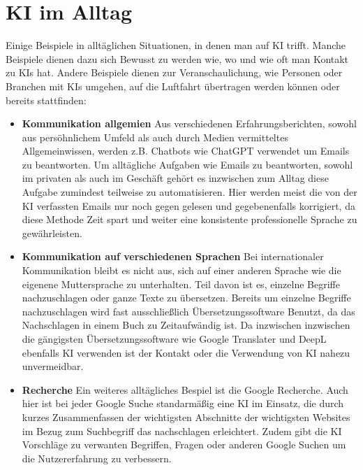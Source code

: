 \section{KI im Alltag}
Einige Beispiele in alltäglichen Situationen, in denen man auf KI trifft. Manche Beispiele dienen dazu sich 
Bewusst zu werden wie, wo und wie oft man Kontakt zu KIs hat. Andere Beispiele dienen zur Veranschaulichung, 
wie Personen oder Branchen mit KIs umgehen, auf die Luftfahrt übertragen werden können oder bereits stattfinden:
\smallskip
\begin{itemize}
    \item \textbf{Kommunikation allgemien}
        Aus verschiedenen Erfahrungsberichten, sowohl aus persöhnlichem Umfeld als auch durch Medien 
        vermitteltes Allgemeinwissen, werden z.B. Chatbots wie ChatGPT verwendet um Emails zu beantworten.
        Um alltägliche Aufgaben wie Emails zu beantworten, sowohl im privaten als auch im Geschäft gehört 
        es inzwischen zum Alltag diese Aufgabe zumindest teilweise zu automatisieren. Hier werden meist die 
        von der KI verfassten Emails nur noch gegen gelesen und gegebenenfalls korrigiert, da diese Methode 
        Zeit spart und weiter eine konsistente professionelle Sprache zu gewährleisten.

    \item \textbf{Kommunikation auf verschiedenen Sprachen}
        Bei internationaler Kommunikation bleibt es nicht aus, sich auf einer anderen Sprache wie die eigenene 
        Muttersprache zu unterhalten. Teil davon ist es, einzelne Begriffe nachzuschlagen oder ganze Texte zu 
        übersetzen. Bereits um einzelne Begriffe nachzuschlagen wird fast ausschließlich Übersetzungssoftware 
        Benutzt, da das Nachschlagen in einem Buch zu Zeitaufwändig ist. Da inzwischen inzwischen die gängigsten 
        Übersetzungssoftware wie Google Translater und DeepL ebenfalls KI verwenden ist der Kontakt oder die 
        Verwendung von KI nahezu unvermeidbar.
        
    \item \textbf{Recherche}
        Ein weiteres alltägliches Bespiel ist die Google Recherche. Auch hier ist bei jeder Google Suche 
        standarmäßig eine KI im Einsatz, die durch kurzes Zusammenfassen der wichtigsten Abschnitte der 
        wichtigsten Websites im Bezug zum Suchbegriff das nachschlagen erleichtert. Zudem gibt die KI Vorschläge 
        zu verwanten Begriffen, Fragen oder anderen Google Suchen um die Nutzererfahrung zu verbessern. 
                

\end{itemize}
